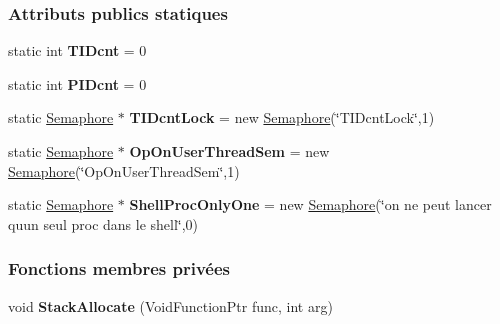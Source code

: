 \subsubsection*{Attributs publics statiques}
\begin{DoxyCompactItemize}
\item 
\hypertarget{class_thread_abefab7459c3d3ad3eb72e5b246fe0923}{}\label{class_thread_abefab7459c3d3ad3eb72e5b246fe0923} 
static int {\bfseries T\+I\+Dcnt} = 0
\item 
\hypertarget{class_thread_ad99ab89f894fb54eb799c1ab1e55c8dd}{}\label{class_thread_ad99ab89f894fb54eb799c1ab1e55c8dd} 
static int {\bfseries P\+I\+Dcnt} = 0
\item 
\hypertarget{class_thread_aae04c21b35329d0cf24ca2f1bab13b58}{}\label{class_thread_aae04c21b35329d0cf24ca2f1bab13b58} 
static \hyperlink{class_semaphore}{Semaphore} $\ast$ {\bfseries T\+I\+Dcnt\+Lock} = new \hyperlink{class_semaphore}{Semaphore}(\char`\"{}T\+I\+Dcnt\+Lock\char`\"{},1)
\item 
\hypertarget{class_thread_a24af7dfa0b618b0488308194b39b256c}{}\label{class_thread_a24af7dfa0b618b0488308194b39b256c} 
static \hyperlink{class_semaphore}{Semaphore} $\ast$ {\bfseries Op\+On\+User\+Thread\+Sem} = new \hyperlink{class_semaphore}{Semaphore}(\char`\"{}Op\+On\+User\+Thread\+Sem\char`\"{},1)
\item 
\hypertarget{class_thread_ae5f35f9aebf2b37e2af68ab44b16fe4a}{}\label{class_thread_ae5f35f9aebf2b37e2af68ab44b16fe4a} 
static \hyperlink{class_semaphore}{Semaphore} $\ast$ {\bfseries Shell\+Proc\+Only\+One} = new \hyperlink{class_semaphore}{Semaphore}(\char`\"{}on ne peut lancer qu\textquotesingle{}un seul proc dans le shell\char`\"{},0)
\end{DoxyCompactItemize}
\subsubsection*{Fonctions membres privées}
\begin{DoxyCompactItemize}
\item 
\hypertarget{class_thread_a171c33e7e9b1ffe9d2a2e02b06a6f4dd}{}\label{class_thread_a171c33e7e9b1ffe9d2a2e02b06a6f4dd} 
void {\bfseries Stack\+Allocate} (Void\+Function\+Ptr func, int arg)
\end{DoxyCompactItemize}
